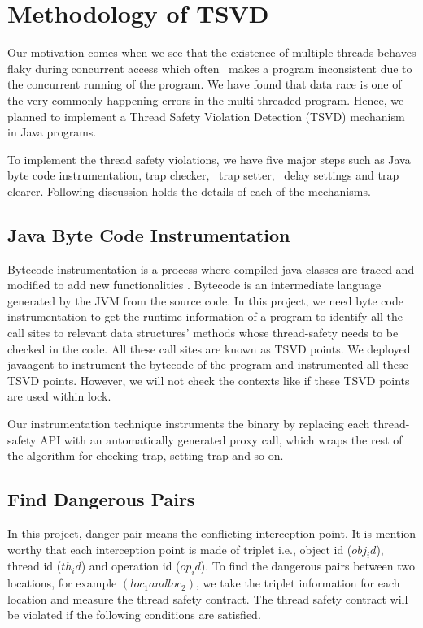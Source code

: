 \section{Methodology of TSVD}
\label{sec:method}

Our motivation comes when we see that the existence of multiple threads behaves flaky during concurrent access which often  makes a
program inconsistent due to the concurrent running of the program. We have
found that data race is one of the very commonly happening errors in the
multi-threaded program. Hence, we planned to implement a Thread Safety Violation
Detection (TSVD) mechanism in Java programs.

To implement the thread safety violations, we have five major steps such as
Java byte code instrumentation, trap checker,  trap setter,  delay settings and
trap clearer. Following discussion holds the details of each of the mechanisms.

\subsection{Java Byte Code Instrumentation}
Bytecode instrumentation is a process where compiled java classes are traced
and modified to add new functionalities \cite{asm}. Bytecode is an intermediate
language generated by the JVM from the source code. In this project, we need
byte code instrumentation to get the runtime information of a program to
identify all the call sites to relevant data structures' methods whose
thread-safety needs to be checked in the code. All these call sites are known
as TSVD points. We deployed javaagent to instrument the bytecode of the
program and instrumented all these TSVD points. However, we will not check the
contexts like if these TSVD points are used within lock.

Our instrumentation technique instruments the binary by replacing each thread-safety
API with an automatically generated proxy call, which wraps the rest of the algorithm for checking trap, setting trap and so on.




\subsection{Find Dangerous Pairs}
In this project, danger pair means the conflicting interception point. It is
mention worthy that each interception point is made of triplet i.e., object id
($obj_id$), thread id ($th_id$) and operation id ($op_id$). To find the dangerous pairs between two locations, for example $(loc_1 and loc_2)$, we take the triplet information for each location and measure the thread safety contract. The thread safety contract will be violated if the following conditions are satisfied.

